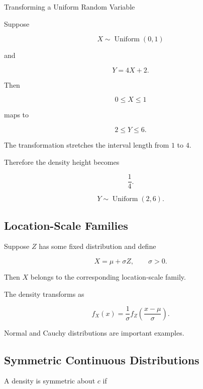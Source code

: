 \begin{workedexamplebox}{Transforming a Uniform Random Variable}

Suppose

\[
X\sim\operatorname{Uniform}(0,1)
\]

and

\[
Y=4X+2.
\]

Then

\[
0\leq X\leq1
\]

maps to

\[
2\leq Y\leq6.
\]

The transformation stretches the interval length from \(1\) to \(4\).

Therefore the density height becomes

\[
\frac14.
\]

\begin{answerbox}
\[
\boxed{
Y\sim\operatorname{Uniform}(2,6).
}
\]
\end{answerbox}

\end{workedexamplebox}

\subsection{Location-Scale Families}
\label{subsec:location-scale-families}

Suppose \(Z\) has some fixed distribution and define

\[
\boxed{
X=\mu+\sigma Z,
\qquad
\sigma>0.
}
\]

Then \(X\) belongs to the corresponding location-scale family.

The density transforms as

\[
\boxed{
f_X(x)
=
\frac1{\sigma}
f_Z
\left(
\frac{x-\mu}{\sigma}
\right).
}
\]

Normal and Cauchy distributions are important examples.

\subsection{Symmetric Continuous Distributions}
\label{subsec:symmetric-continuous-distributions}

A density is symmetric about \(c\) if

